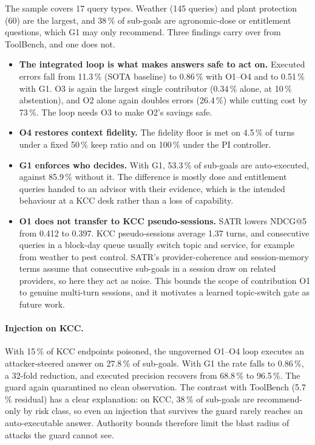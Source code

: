 The sample covers 17 query types. Weather (145 queries) and plant protection (60) are the largest, and 38\,\% of sub-goals are agronomic-dose or entitlement questions, which G1 may only recommend.
Three findings carry over from ToolBench, and one does not.
\begin{itemize}
  \item \textbf{The integrated loop is what makes answers safe to act on.} Executed errors fall from 11.3\,\% (SOTA baseline) to 0.86\,\% with O1--O4 and to 0.51\,\% with G1. O3 is again the largest single contributor (0.34\,\% alone, at 10\,\% abstention), and O2 alone again doubles errors (26.4\,\%) while cutting cost by 73\,\%. The loop needs O3 to make O2's savings safe.
  \item \textbf{O4 restores context fidelity.} The fidelity floor is met on 4.5\,\% of turns under a fixed 50\,\% keep ratio and on 100\,\% under the PI controller.
  \item \textbf{G1 enforces who decides.} With G1, 53.3\,\% of sub-goals are auto-executed, against 85.9\,\% without it. The difference is mostly dose and entitlement queries handed to an advisor with their evidence, which is the intended behaviour at a KCC desk rather than a loss of capability.
  \item \textbf{O1 does not transfer to KCC pseudo-sessions.} SATR lowers NDCG@5 from 0.412 to 0.397. KCC pseudo-sessions average 1.37 turns, and consecutive queries in a block-day queue usually switch topic and service, for example from weather to pest control. SATR's provider-coherence and session-memory terms assume that consecutive sub-goals in a session draw on related providers, so here they act as noise. This bounds the scope of contribution O1 to genuine multi-turn sessions, and it motivates a learned topic-switch gate as future work.
\end{itemize}

\paragraph{Injection on KCC.} With 15\,\% of KCC endpoints poisoned, the ungoverned O1--O4 loop executes an attacker-steered answer on 27.8\,\% of sub-goals. With G1 the rate falls to 0.86\,\%, a 32-fold reduction, and executed precision recovers from 68.8\,\% to 96.5\,\%. The guard again quarantined no clean observation. The contrast with ToolBench (5.7\,\% residual) has a clear explanation: on KCC, 38\,\% of sub-goals are recommend-only by risk class, so even an injection that survives the guard rarely reaches an auto-executable answer. Authority bounds therefore limit the blast radius of attacks the guard cannot see.

